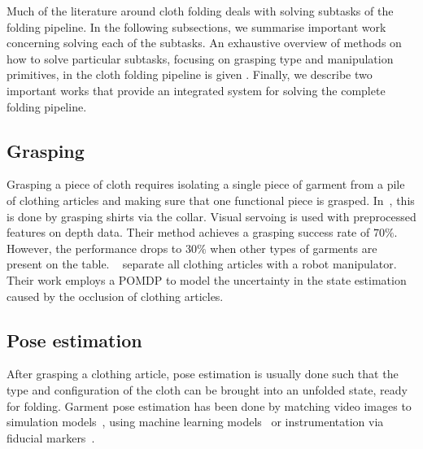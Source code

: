 Much of the literature around cloth folding deals with solving subtasks of the folding pipeline. In the following subsections, we summarise important work concerning solving each of the subtasks. An exhaustive overview of methods on how to solve particular subtasks, focusing on grasping type and manipulation primitives, in the cloth folding pipeline is given \autocite{Borras2020}. Finally, we describe two important works that provide an integrated system for solving the complete folding pipeline.

\subsection{Grasping}
Grasping a piece of cloth requires isolating a single piece of garment from a pile of clothing articles and making sure that one functional piece is grasped. In~\autocite{Ramisa2012}, this is done by grasping shirts via the collar. Visual servoing is used with preprocessed features on depth data. Their method achieves a grasping success rate of $70\%$. However, the performance drops to $30\%$ when other types of garments are present on the table. ~\autocite{Monso2012} separate all clothing articles with a robot manipulator. Their work employs a \acrshort{POMDP} to model the uncertainty in the state estimation caused by the occlusion of clothing articles.

\subsection{Pose estimation}
After grasping a clothing article, pose estimation is usually done such that the type and configuration of the cloth can be brought into an unfolded state, ready for folding. Garment pose estimation has been done by matching video images to simulation models~\autocite{Kita2002}, using machine learning models~\autocite{Li2014, li2014volum} or instrumentation via fiducial markers~\autocite{Bersch2011}.

